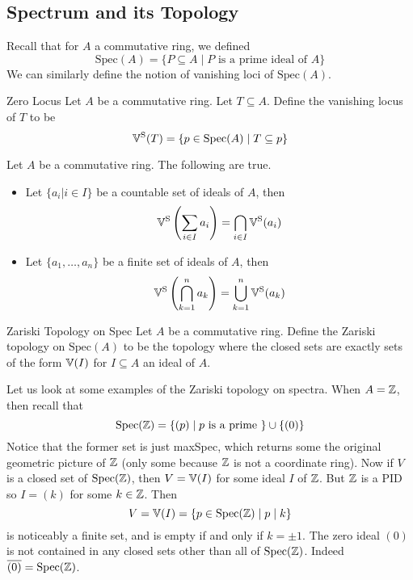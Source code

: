 \documentclass[a4paper]{article}
\begin{document}
\subsection{Spectrum and its Topology}
Recall that for $A$ a commutative ring, we defined $$\text{Spec}(A)=\{P\subseteq A\;|\;P\text{ is a prime ideal of }A\}$$ We can similarly define the notion of vanishing loci of $\text{Spec}(A)$. 

\begin{defn}{Zero Locus}{} Let $A$ be a commutative ring. Let $T\subseteq A$. Define the vanishing locus of $T$ to be $$\mathbb{V}^\text{S}(T)=\{p\in\text{Spec}(A)\;|\;T\subseteq p\}$$
\end{defn}

\begin{lmm}{}{} Let $A$ be a commutative ring. The following are true. 
\begin{itemize}
\item Let $\{a_i|i\in I\}$ be a countable set of ideals of $A$, then $$\mathbb{V}^\text{S}\left(\sum_{i\in I}a_i\right)=\bigcap_{i\in I}\mathbb{V}^\text{S}(a_i)$$
\item Let $\{a_1,\dots,a_n\}$ be a finite set of ideals of $A$, then $$\mathbb{V}^\text{S}\left(\bigcap_{k=1}^na_k\right)=\bigcup_{k=1}^n\mathbb{V}^\text{S}(a_k)$$
\end{itemize}
\end{lmm}

\begin{defn}{Zariski Topology on Spec}{} Let $A$ be a commutative ring. Define the Zariski topology on $\text{Spec}(A)$ to be the topology where the closed sets are exactly sets of the form $\mathbb{V}(I)$ for $I\subseteq A$ an ideal of $A$. 
\end{defn}

Let us look at some examples of the Zariski topology on spectra. When $A=\mathbb{Z}$, then recall that $$\text{Spec}(\mathbb{Z})=\{(p)\;|\;p\text{ is a prime }\}\cup\{(0)\}$$ Notice that the former set is just maxSpec, which returns some the original geometric picture of $\mathbb{Z}$ (only some because $\mathbb{Z}$ is not a coordinate ring). Now if $V$ is a closed set of $\text{Spec}(\mathbb{Z})$, then $V=\mathbb{V}(I)$ for some ideal $I$ of $\mathbb{Z}$. But $\mathbb{Z}$ is a PID so $I=(k)$ for some $k\in\mathbb{Z}$. Then $$V=\mathbb{V}(I)=\{p\in\text{Spec}(\mathbb{Z})\;|\;p\;|\;k\}$$ is noticeably a finite set, and is empty if and only if $k=\pm1$. The zero ideal $(0)$ is not contained in any closed sets other than all of $\text{Spec}(\mathbb{Z})$. Indeed $\overline{(0)}=\text{Spec}(\mathbb{Z})$. \\~\\
\end{document}
